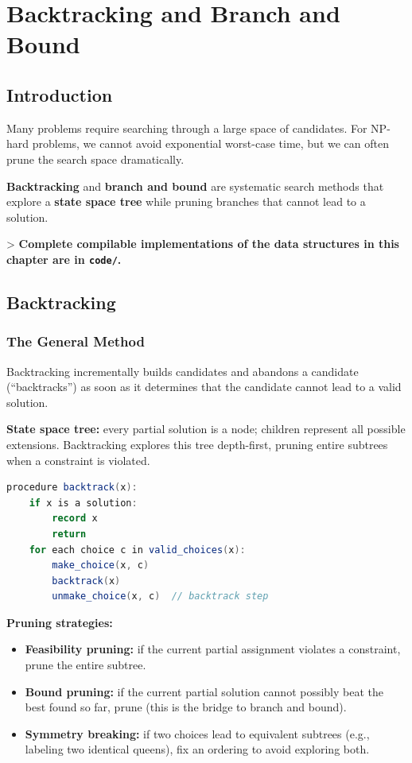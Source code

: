 \chapter{Backtracking and Branch and Bound}\label{ch18:backtracking-and-branch-and-bound}

\section{Introduction}

Many problems require searching through a large space of candidates. For NP-hard problems, we cannot avoid exponential worst-case time, but we can often prune the search space dramatically.

\textbf{Backtracking} and \textbf{branch and bound} are systematic search methods that explore a \textbf{state space tree} while pruning branches that cannot lead to a solution.

> \textbf{Complete compilable implementations of the data structures in this chapter are in \texttt{code/}.}

\section{Backtracking}

\subsection{The General Method}

Backtracking incrementally builds candidates and abandons a candidate (``backtracks'') as soon as it determines that the candidate cannot lead to a valid solution.

\textbf{State space tree:} every partial solution is a node; children represent all possible extensions. Backtracking explores this tree depth-first, pruning entire subtrees when a constraint is violated.

\begin{lstlisting}[language=Java]
procedure backtrack(x):
    if x is a solution:
        record x
        return
    for each choice c in valid_choices(x):
        make_choice(x, c)
        backtrack(x)
        unmake_choice(x, c)  // backtrack step
\end{lstlisting}

\textbf{Pruning strategies:}
\begin{itemize}
\item \textbf{Feasibility pruning:} if the current partial assignment violates a constraint, prune the entire subtree.
\item \textbf{Bound pruning:} if the current partial solution cannot possibly beat the best found so far, prune (this is the bridge to branch and bound).
\item \textbf{Symmetry breaking:} if two choices lead to equivalent subtrees (e.g., labeling two identical queens), fix an ordering to avoid exploring both.
\end{itemize}

